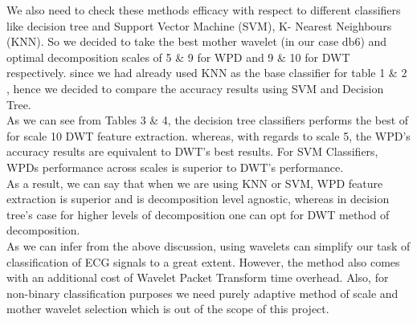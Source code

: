 \documentclass[10pt,twocolumn,letterpaper]{article}
\begin{document}
\begin{table}[htbp]
\caption{Decision Tree - Classification Accuracy :- \\ DWT vs WPD}
\label{tab:caption}
\end{table}
We also need to check these methods efficacy with respect to different classifiers like decision tree and Support Vector Machine (SVM), K- Nearest Neighbours (KNN). So we decided to take the best mother wavelet (in our case db6) and optimal decomposition scales of 5 \& 9 for WPD and 9 \& 10 for DWT respectively.
since we had already used KNN as the base classifier for table 1 \& 2 , hence we decided to compare the accuracy results using SVM and Decision Tree.\\
As we can see from Tables 3 \& 4, the decision tree classifiers performs the best of for scale 10 DWT feature extraction. whereas, with regards to scale 5, the WPD's accuracy results are equivalent to DWT's best results. For SVM Classifiers, WPDs performance across scales is superior to DWT's performance.\\
As a result, we can say that when we are using KNN or SVM, WPD feature extraction is superior and is decomposition level agnostic, whereas in decision tree's case for higher levels of decomposition one can opt for DWT method of decomposition.\\
As we can infer from the above discussion, using wavelets can simplify our task of classification of ECG signals to a great extent. However, the method also comes with an additional cost of Wavelet Packet Transform time overhead. Also, for non-binary classification purposes we need purely adaptive method of scale and mother wavelet selection which is out of the scope of this project.
\end{document}
